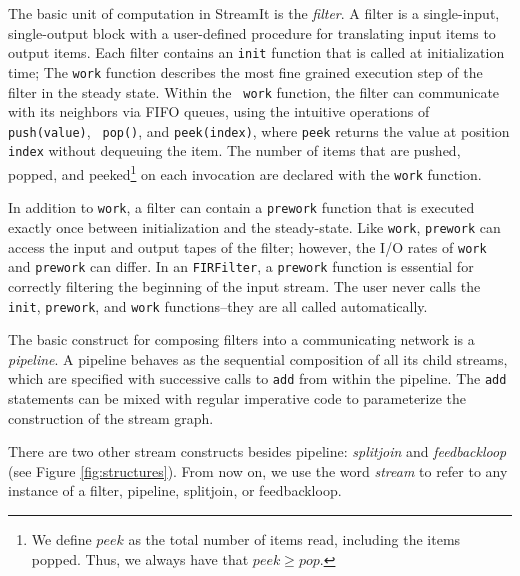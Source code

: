 The basic unit of computation in StreamIt is the {\it filter}.  A
filter is a single-input, single-output block with a user-defined
procedure for translating input items to output items.  
Each filter contains an {\tt init}
function that is called at initialization time; 
The {\tt work} function describes the most fine grained
execution step of the filter in the steady state.  Within the {\tt
work} function, the filter can communicate with its neighbors via FIFO
queues, using the intuitive operations of {\tt push(value)}, {\tt
pop()}, and {\tt peek(index)}, where {\tt peek} returns the value at
position {\tt index} without dequeuing the item.  The number of items
that are pushed, popped, and peeked\footnote{We define $peek$ as the
total number of items read, including the items popped.  Thus, we
always have that $peek \ge pop$.} on each invocation are declared with
the {\tt work} function.

In addition to {\tt work}, a filter can contain a {\tt prework}
function that is executed exactly once between initialization and the
steady-state.  Like {\tt work}, {\tt prework} can access the input and
output tapes of the filter; however, the I/O rates of {\tt work} and
{\tt prework} can differ.  In an {\tt FIRFilter}, a {\tt prework}
function is essential for correctly filtering the beginning of the
input stream.  The user never calls the {\tt init}, {\tt prework}, and
{\tt work} functions--they are all called automatically.


The basic construct for composing filters into a communicating network
is a {\it pipeline}.%
A pipeline behaves as the sequential composition
of all its child streams, which are specified with successive calls to
{\tt add} from within the pipeline.  
The {\tt add} statements can be mixed with regular imperative code to
parameterize the construction of the stream graph.

There are two other stream constructs besides pipeline: {\it
splitjoin} and {\it feedbackloop} (see Figure \ref{fig:structures}).
From now on, we use the word {\it stream} to refer to any instance of
a filter, pipeline, splitjoin, or feedbackloop.

